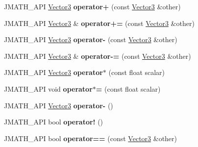 \begin{DoxyCompactItemize}
\item 
\hypertarget{class_vector3_ac6aae9ef2836b00b39f04d5e8cfec996}{J\+M\+A\+T\+H\+\_\+\+A\+P\+I \hyperlink{class_vector3}{Vector3} {\bfseries operator+} (const \hyperlink{class_vector3}{Vector3} \&other)}\label{class_vector3_ac6aae9ef2836b00b39f04d5e8cfec996}

\item 
\hypertarget{class_vector3_a9dbccb6721900d305483b20dfcfc5f45}{J\+M\+A\+T\+H\+\_\+\+A\+P\+I \hyperlink{class_vector3}{Vector3} \& {\bfseries operator+=} (const \hyperlink{class_vector3}{Vector3} \&other)}\label{class_vector3_a9dbccb6721900d305483b20dfcfc5f45}

\item 
\hypertarget{class_vector3_a3c97ca1aaedd26faa7be1314938eb7cc}{J\+M\+A\+T\+H\+\_\+\+A\+P\+I \hyperlink{class_vector3}{Vector3} {\bfseries operator-\/} (const \hyperlink{class_vector3}{Vector3} \&other)}\label{class_vector3_a3c97ca1aaedd26faa7be1314938eb7cc}

\item 
\hypertarget{class_vector3_a4ef4d60ca82e5bad1d9ed91c79b447b4}{J\+M\+A\+T\+H\+\_\+\+A\+P\+I \hyperlink{class_vector3}{Vector3} \& {\bfseries operator-\/=} (const \hyperlink{class_vector3}{Vector3} \&other)}\label{class_vector3_a4ef4d60ca82e5bad1d9ed91c79b447b4}

\item 
\hypertarget{class_vector3_a3ff0140aa3505a55ca8c34ddec68d13c}{J\+M\+A\+T\+H\+\_\+\+A\+P\+I \hyperlink{class_vector3}{Vector3} {\bfseries operator$\ast$} (const float scalar)}\label{class_vector3_a3ff0140aa3505a55ca8c34ddec68d13c}

\item 
\hypertarget{class_vector3_a0967930178b7243edc2a2e3d8c97c1c2}{J\+M\+A\+T\+H\+\_\+\+A\+P\+I void {\bfseries operator$\ast$=} (const float scalar)}\label{class_vector3_a0967930178b7243edc2a2e3d8c97c1c2}

\item 
\hypertarget{class_vector3_ab2520b3cbe9957332776ff905298b686}{J\+M\+A\+T\+H\+\_\+\+A\+P\+I \hyperlink{class_vector3}{Vector3} {\bfseries operator-\/} ()}\label{class_vector3_ab2520b3cbe9957332776ff905298b686}

\item 
\hypertarget{class_vector3_a3a27065ebf285238beada28ef34d4d92}{J\+M\+A\+T\+H\+\_\+\+A\+P\+I bool {\bfseries operator!} ()}\label{class_vector3_a3a27065ebf285238beada28ef34d4d92}

\item 
\hypertarget{class_vector3_acc0738d9f3ef7de9deb35b27472e6397}{J\+M\+A\+T\+H\+\_\+\+A\+P\+I bool {\bfseries operator==} (const \hyperlink{class_vector3}{Vector3} \&other)}\label{class_vector3_acc0738d9f3ef7de9deb35b27472e6397}


\end{DoxyCompactItemize}
